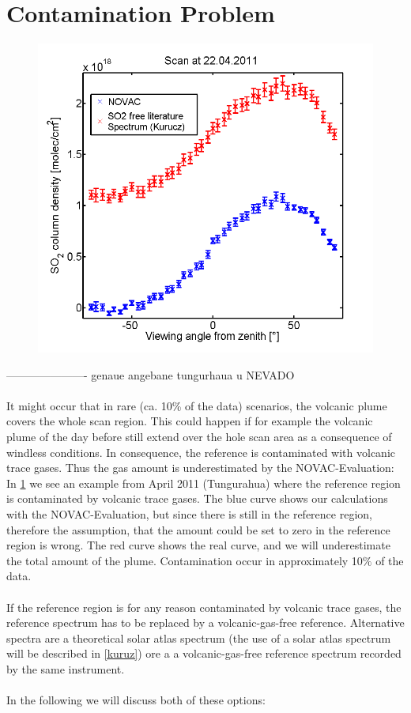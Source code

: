 \documentclass  [
  paper    = a4,
  BCOR     = 10mm,
  twoside,
  fontsize = 12pt,
  fleqn,
  toc      = bibnumbered,
  toc      = listofnumbered,
  numbers  = noendperiod,
  headings = normal,
  listof   = leveldown,
  version  = 3.03
]                                       {scrreprt}
\begin{document}
	\section{Contamination Problem}
	\begin{figure}
		\centering
		\includegraphics[width=0.7\linewidth]{Bilder/contaminated}
		\caption{}
		\label{fig:contaminated}
	\end{figure}
	---------------------- genaue angebane tungurhaua u NEVADO\\
	\\
	It might occur that in rare (ca. 10\% of the data) scenarios, the
	volcanic plume covers the whole scan region.
	This could happen if for example the volcanic plume of the day before still extend over the hole scan area as a consequence of windless conditions.
	In consequence, the reference	is contaminated with volcanic trace gases. Thus the gas amount is underestimated by the NOVAC-Evaluation: In \cref{fig:contaminated} we see an example from April 2011 (Tungurahua) where the reference region is contaminated by volcanic trace gases. The blue  curve shows our calculations with the NOVAC-Evaluation, but since there is still  in the reference region, therefore the assumption, that the  amount could be set to zero in the reference region is wrong. The red curve shows the real  curve, and we will underestimate the total  amount of the plume. Contamination occur in approximately 10$\%$ of the data.\\
	\\
	If the reference region is for any reason
	contaminated by volcanic trace gases, the reference spectrum has to be
	replaced by a volcanic-gas-free reference. Alternative spectra are a
	theoretical solar atlas spectrum (the use of a solar atlas spectrum will be described in \cref{kuruz}) ore a a volcanic-gas-free reference
	spectrum recorded by the same instrument.\\ 
	\\
	In the following we will discuss both of these options:
\end{document}
